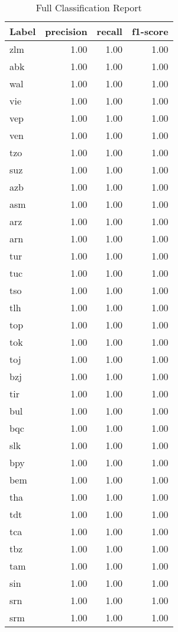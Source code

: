 \begin{table}
\caption{Full Classification Report}
\label{tab:full_classification_report}
\begin{tabular}{lrrr}
\toprule
Label & precision & recall & f1-score \\
\midrule
zlm & 1.00 & 1.00 & 1.00 \\
abk & 1.00 & 1.00 & 1.00 \\
wal & 1.00 & 1.00 & 1.00 \\
vie & 1.00 & 1.00 & 1.00 \\
vep & 1.00 & 1.00 & 1.00 \\
ven & 1.00 & 1.00 & 1.00 \\
tzo & 1.00 & 1.00 & 1.00 \\
suz & 1.00 & 1.00 & 1.00 \\
azb & 1.00 & 1.00 & 1.00 \\
asm & 1.00 & 1.00 & 1.00 \\
arz & 1.00 & 1.00 & 1.00 \\
arn & 1.00 & 1.00 & 1.00 \\
tur & 1.00 & 1.00 & 1.00 \\
tuc & 1.00 & 1.00 & 1.00 \\
tso & 1.00 & 1.00 & 1.00 \\
tlh & 1.00 & 1.00 & 1.00 \\
top & 1.00 & 1.00 & 1.00 \\
tok & 1.00 & 1.00 & 1.00 \\
toj & 1.00 & 1.00 & 1.00 \\
bzj & 1.00 & 1.00 & 1.00 \\
tir & 1.00 & 1.00 & 1.00 \\
bul & 1.00 & 1.00 & 1.00 \\
bqc & 1.00 & 1.00 & 1.00 \\
slk & 1.00 & 1.00 & 1.00 \\
bpy & 1.00 & 1.00 & 1.00 \\
bem & 1.00 & 1.00 & 1.00 \\
tha & 1.00 & 1.00 & 1.00 \\
tdt & 1.00 & 1.00 & 1.00 \\
tca & 1.00 & 1.00 & 1.00 \\
tbz & 1.00 & 1.00 & 1.00 \\
tam & 1.00 & 1.00 & 1.00 \\
sin & 1.00 & 1.00 & 1.00 \\
srn & 1.00 & 1.00 & 1.00 \\
srm & 1.00 & 1.00 & 1.00 \\

\end{tabular}
\end{table}

